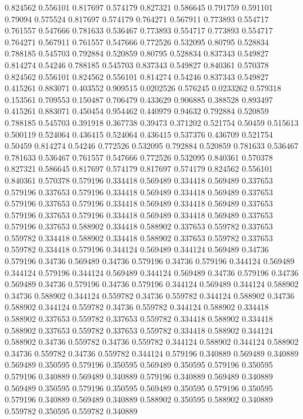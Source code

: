 0.824562 0.556101
0.817697 0.574179
0.827321 0.586645
0.791759 0.591101
0.79094 0.575524
0.817697 0.574179
0.764271 0.567911
0.773893 0.554717
0.761557 0.547666
0.781633 0.536467
0.773893 0.554717
0.773893 0.554717
0.764271 0.567911
0.761557 0.547666
0.772526 0.532095
0.80795 0.528834
0.788185 0.545703
0.792884 0.520859
0.80795 0.528834
0.837343 0.549827
0.814274 0.54246
0.788185 0.545703
0.837343 0.549827
0.840361 0.570378
0.824562 0.556101
0.824562 0.556101
0.814274 0.54246
0.837343 0.549827
0.415261 0.883071
0.403552 0.909515
0.0202526 0.576245
0.0233262 0.579318
0.153561 0.709553
0.150487 0.706479
0.433629 0.906885
0.388528 0.893497
0.415261 0.883071
0.450454 0.954462
0.440979 0.94632
0.792884 0.520859
0.788185 0.545703
0.391918 0.367738
0.39473 0.371202
0.521754 0.50459
0.515613 0.500119
0.524064 0.436415
0.524064 0.436415
0.537376 0.436709
0.521754 0.50459
0.814274 0.54246
0.772526 0.532095
0.792884 0.520859
0.781633 0.536467
0.781633 0.536467
0.761557 0.547666
0.772526 0.532095
0.840361 0.570378
0.827321 0.586645
0.817697 0.574179
0.817697 0.574179
0.824562 0.556101
0.840361 0.570378
0.579196 0.334418
0.569489 0.334418
0.569489 0.337653
0.579196 0.337653
0.579196 0.334418
0.569489 0.334418
0.569489 0.337653
0.579196 0.337653
0.579196 0.334418
0.569489 0.334418
0.569489 0.337653
0.579196 0.337653
0.579196 0.334418
0.569489 0.334418
0.569489 0.337653
0.579196 0.337653
0.588902 0.334418
0.588902 0.337653
0.559782 0.337653
0.559782 0.334418
0.588902 0.334418
0.588902 0.337653
0.559782 0.337653
0.559782 0.334418
0.579196 0.344124
0.569489 0.344124
0.569489 0.34736
0.579196 0.34736
0.569489 0.34736
0.579196 0.34736
0.579196 0.344124
0.569489 0.344124
0.579196 0.344124
0.569489 0.344124
0.569489 0.34736
0.579196 0.34736
0.569489 0.34736
0.579196 0.34736
0.579196 0.344124
0.569489 0.344124
0.588902 0.34736
0.588902 0.344124
0.559782 0.34736
0.559782 0.344124
0.588902 0.34736
0.588902 0.344124
0.559782 0.34736
0.559782 0.344124
0.588902 0.334418
0.588902 0.337653
0.559782 0.337653
0.559782 0.334418
0.588902 0.334418
0.588902 0.337653
0.559782 0.337653
0.559782 0.334418
0.588902 0.344124
0.588902 0.34736
0.559782 0.34736
0.559782 0.344124
0.588902 0.344124
0.588902 0.34736
0.559782 0.34736
0.559782 0.344124
0.579196 0.340889
0.569489 0.340889
0.569489 0.350595
0.579196 0.350595
0.569489 0.350595
0.579196 0.350595
0.579196 0.340889
0.569489 0.340889
0.579196 0.340889
0.569489 0.340889
0.569489 0.350595
0.579196 0.350595
0.569489 0.350595
0.579196 0.350595
0.579196 0.340889
0.569489 0.340889
0.588902 0.350595
0.588902 0.340889
0.559782 0.350595
0.559782 0.340889
